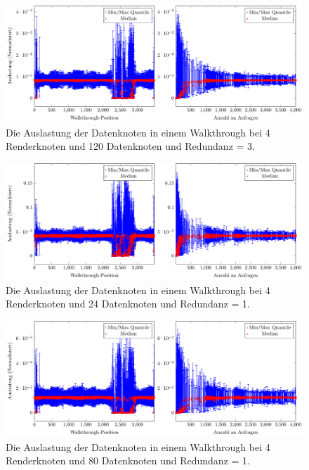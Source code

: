 \begin{figure}
\centering
\includegraphics[scale=0.75]{images/diag_cCol_red3_render4_data120_2x.pdf}
\caption{\label{fig:eval:cCol1}Die Auslastung der Datenknoten in einem Walkthrough bei 4 Renderknoten und 120 Datenknoten und Redundanz = 3.}
\end{figure}

\begin{figure}
\centering
\includegraphics[scale=0.75]{images/diag_cCol_red1_render4_data24_2x.pdf}
\caption{\label{fig:eval:cCol1}Die Auslastung der Datenknoten in einem Walkthrough bei 4 Renderknoten und 24 Datenknoten und Redundanz = 1.}
\end{figure}

\begin{figure}
\centering
\includegraphics[scale=0.75]{images/diag_cCol_red1_render4_data80_2x.pdf}
\caption{\label{fig:eval:cCol1}Die Auslastung der Datenknoten in einem Walkthrough bei 4 Renderknoten und 80 Datenknoten und Redundanz = 1.}
\end{figure}

